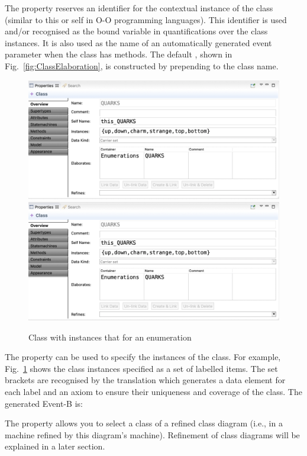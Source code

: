 The  property reserves an identifier for the contextual instance of the class (similar to this or self in O-O programming languages).
This identifier is used and/or recognised as the bound variable in quantifications over the class instances.
It is also used as the name of an automatically generated event parameter when the class has methods.
The default , shown in Fig.~\ref{fig:ClassElaboration}, is constructed by prepending  to the class name.


\begin{figure}[!htbp]
	\centering
	\ifplastex
	\includegraphics[width=1000]{figures/ClassEnumeration.png}
	\else
	\includegraphics[width=1\textwidth]{figures/ClassEnumeration.png}
	\fi
	\caption{Class with instances that for an enumeration}
	\label{fig:ClassEnumeration}
\end{figure}


The  property can be used to specify the instances of the class.
For example, Fig.~\ref{fig:ClassEnumeration} shows the class instances specified as a set of labelled items.
The set brackets are recognised by the translation which generates a data element for each label and an axiom to ensure their uniqueness and coverage of the class.
The generated Event-B is:

\END

The  property allows you to select a class of a refined class diagram (i.e., in a machine refined by this diagram's machine).
Refinement of class diagrams will be explained in a later section.

 
